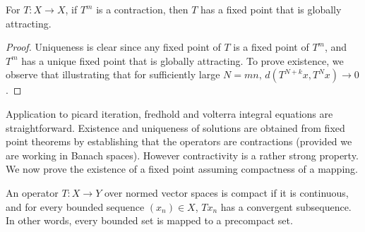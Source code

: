 \begin{theorem}
    For $T:X\rightarrow X$, if $T^m$ is a contraction, then $T$ has a fixed point that is globally attracting.
\end{theorem}
\begin{proof}
    Uniqueness is clear since any fixed point of $T$ is a fixed point of $T^m$, and $T^m$ has a unique fixed point that is globally attracting. To prove existence, we observe that
    illustrating that for sufficiently large $N=mn,\,d\left(T^{N+k}x,T^Nx\right)\rightarrow0$.
\end{proof}

Application to picard iteration, fredhold and volterra integral equations are straightforward. Existence and uniqueness of solutions are obtained from fixed point theorems by establishing that the operators are contractions (provided we are working in Banach spaces). However contractivity is a rather strong property. We now prove the existence of a fixed point assuming compactness of a mapping.

\begin{definition}
    An operator $T:X\rightarrow Y$ over normed vector spaces is compact if it is continuous, and for every bounded sequence $(x_n)\in X$, $Tx_n$ has a convergent subsequence. In other words, every bounded set is mapped to a precompact set.
\end{definition}